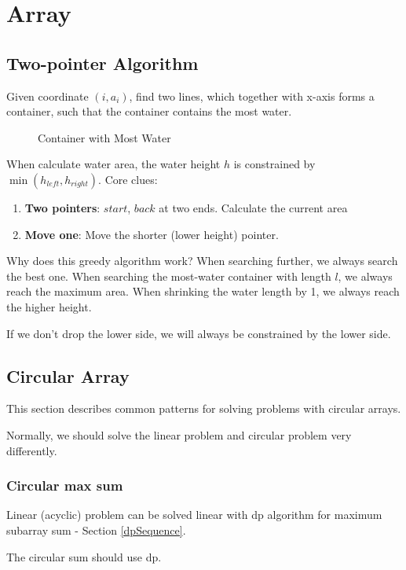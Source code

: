 \chapter{Array}
\section{Two-pointer Algorithm}
 Given coordinate $(i, a_i)$, find two lines, which together with x-axis forms a container, such that the container contains the most water.
\begin{figure}[hbtp]
\centering
{}
\caption{Container with Most Water}
\label{fig:Container-With-Most-Water}
\end{figure}

When calculate water area, the water height $h$ is constrained by $\min(h_{left}, h_{right})$. Core clues:
\begin{enumerate}
\item \textbf{Two pointers}: $start$, $back$ at two ends. Calculate the current area
\item \textbf{Move one}: Move the shorter (lower height) pointer. 
\end{enumerate}

Why does this greedy algorithm work? When searching further, we always search the best one.  When searching the most-water container with length $l$, we always reach the maximum area. When shrinking the water length by 1, we always reach the higher height. 

If we don't drop the lower side, we will always be constrained by the lower side. 
\section{Circular Array}
This section describes common patterns for solving problems with circular arrays.

Normally, we should solve the linear problem and circular problem very differently.

\subsection{Circular max sum}
Linear (acyclic) problem can be solved linear with dp algorithm for maximum subarray sum - Section \ref{dpSequence}. 

The circular sum should use dp. 

